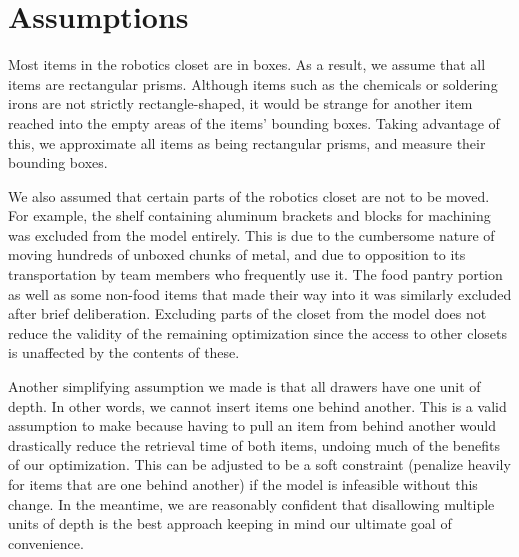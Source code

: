\documentclass[10pt]{article}
\theoremstyle{named}
\begin{document}
\section{Assumptions}
Most items in the robotics closet are in boxes. As a result, we assume that all
items are rectangular prisms. Although items such as the chemicals or soldering irons
are not strictly rectangle-shaped, it would be strange for another item reached into
the empty areas of the items' bounding boxes. Taking advantage of this, we approximate
all items as being rectangular prisms, and measure their bounding boxes.
\par
We also assumed that certain parts of the robotics closet are not to be moved. For example, the shelf containing aluminum brackets and blocks for machining was excluded from the model entirely. This is due to the cumbersome nature of moving hundreds of unboxed chunks of metal, and due to opposition to its transportation by team members who frequently use it. The food pantry portion as well as some non-food items that made their way into it was similarly excluded after brief deliberation. Excluding parts of the closet from the model does not reduce the validity of the remaining optimization since the access to other closets is unaffected by the contents of these.
\par
Another simplifying assumption we made is that all drawers have one unit of depth. In other words, we cannot insert items one behind another. This is a valid assumption to make because having to pull an item from behind another would drastically reduce the retrieval time of both items, undoing much of the benefits of our optimization. This can be adjusted to be a soft constraint (penalize heavily for items that are one behind another) if the model is infeasible without this change. In the meantime, we are reasonably confident that disallowing multiple units of depth is the best approach keeping in mind our ultimate goal of convenience.
\end{document}
